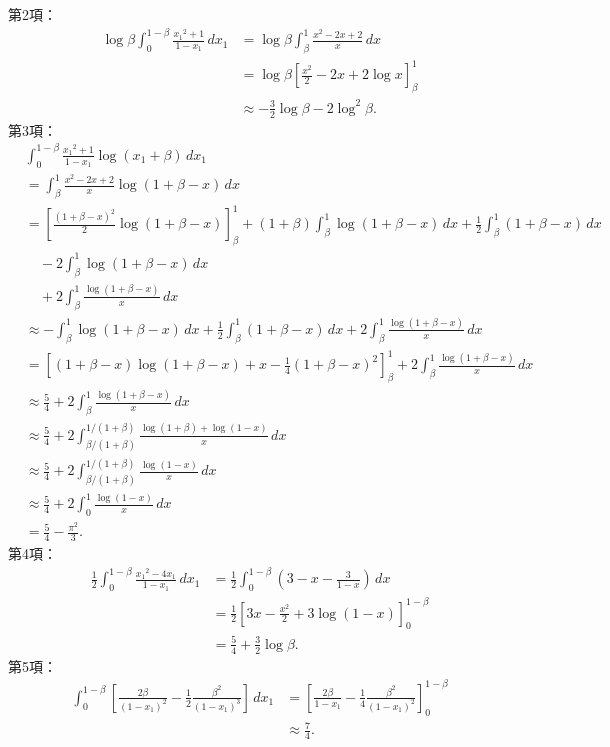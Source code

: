 第2項：
\begin{align*}
  \log\beta \int_0^{1-\beta} \frac{x_1{}^2 + 1}{1 - x_1} \, dx_1
  &= \log\beta \int_\beta^1 \frac{x^2 - 2x + 2}{x} \, dx \\
  &= \log\beta \left[ \frac{x^2}{2} - 2x + 2 \log x \right]_\beta^1 \\
  &\approx - \frac{3}{2} \log\beta - 2 \log^2 \beta .
\end{align*}
第3項：
\begin{align*}
  & \int_0^{1-\beta} \frac{x_1{}^2 + 1}{1 - x_1} \log(x_1 + \beta) \, dx_1 \\
  &= \int_\beta^1 \frac{x^2 - 2x + 2}{x} \log(1 + \beta - x) \, dx \\
  &= \left[ \frac{(1+\beta-x)^2}{2} \log (1+\beta-x) \right]_\beta^1
  + (1+\beta) \int_\beta^1 \log(1+\beta-x) \, dx
  + \frac{1}{2} \int_\beta^1 (1+\beta-x) \, dx \\
  & \quad - 2 \int_\beta^1 \log(1+\beta-x) \, dx \\
  & \quad + 2 \int_\beta^1 \frac{\log(1+\beta-x)}{x} \, dx \\
  &\approx - \int_\beta^1 \log(1+\beta-x) \, dx
  + \frac{1}{2} \int_\beta^1 (1+\beta-x) \, dx
  + 2 \int_\beta^1 \frac{\log(1+\beta-x)}{x} \, dx \\
  &= \left[ (1+\beta-x) \log (1+\beta-x) + x - \frac{1}{4} (1+\beta-x)^2 \right]_\beta^1
  + 2 \int_\beta^1 \frac{\log(1+\beta-x)}{x} \, dx \\
  &\approx \frac{5}{4} + 2 \int_\beta^1 \frac{\log(1+\beta-x)}{x} \, dx \\
  &\approx \frac{5}{4} + 2 \int_{\beta/(1+\beta)}^{1/(1+\beta)} \frac{\log(1+\beta) + \log(1-x)}{x} \, dx \\
  &\approx \frac{5}{4} + 2 \int_{\beta/(1+\beta)}^{1/(1+\beta)} \frac{\log(1-x)}{x} \, dx \\
  &\approx \frac{5}{4} + 2 \int_0^1 \frac{\log(1-x)}{x} \, dx \\
  &= \frac{5}{4} - \frac{\pi^2}{3} .
\end{align*}
第4項：
\begin{align*}
  \frac{1}{2} \int_0^{1-\beta} \frac{x_1{}^2 - 4x_1}{1-x_1} \, dx_1
  &= \frac{1}{2} \int_0^{1-\beta} \left( 3 - x - \frac{3}{1-x} \right) \, dx \\
  &= \frac{1}{2} \left[ 3x - \frac{x^2}{2} + 3 \log(1-x) \right]_0^{1-\beta} \\
  &= \frac{5}{4} + \frac{3}{2} \log\beta .
\end{align*}
第5項：
\begin{align*}
  \int_0^{1-\beta} \left[ \frac{2\beta}{(1-x_1)^2} - \frac{1}{2} \frac{\beta^2}{(1-x_1)^3} \right] \, dx_1 &= \left[ \frac{2\beta}{1-x_1} - \frac{1}{4} \frac{\beta^2}{(1-x_1)^2} \right]_0^{1-\beta} \\
  &\approx \frac{7}{4} .
\end{align*}

